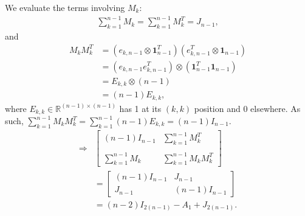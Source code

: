 \begin{itemize}
    We evaluate the terms involving $M_k$:
    \begin{align*}
        \sum_{k=1}^{n-1} M_k = \sum_{k=1}^{n-1}M_k^T = J_{n-1},
    \end{align*}
    and
    \begin{align*}
        M_kM_k^T &= (e_{k,n-1} \otimes \mathbf{1}_{n-1}^T)(e_{k,n-1}^T \otimes \mathbf{1}_{n-1}) \\
        &= (e_{k,n-1}e_{k,n-1}^T) \otimes (\mathbf{1}_{n-1}^T\mathbf{1}_{n-1}) \\
        &= E_{k,k} \otimes (n-1) \\
        &= (n-1)E_{k,k},
    \end{align*}
    where $E_{k,k}\in\mathbb{R}^{(n-1)\times(n-1)}$ has 1 at its $(k,k)$ position and 0 elsewhere. As such, $\sum_{k=1}^{n-1} M_kM_k^T =\sum_{k=1}^{n-1}(n-1)E_{k,k} = (n-1)I_{n-1}$.
    \begin{align*}
        \Rightarrow&\begin{bmatrix}
            (n-1)I_{n-1} & \sum_{k=1}^{n-1} M_k^T \\ \\
            \sum^{n-1}_{k=1}M_k & \sum_{k=1}^{n-1}M_kM_k^T
        \end{bmatrix}\\
        &= \begin{bmatrix}
            (n-1)I_{n-1} & J_{n-1} \\
            J_{n-1} & (n-1)I_{n-1}
        \end{bmatrix}\\
        &= (n-2)I_{2(n-1)} - A_1 + J_{2(n-1)}.
    \end{align*}
    

\end{itemize}
